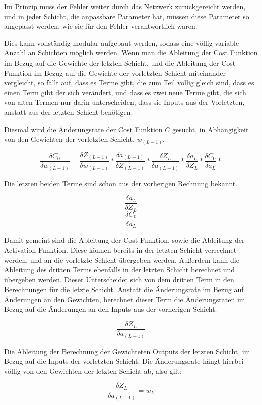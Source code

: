 \documentclass[12pt]{article}
\begin{document}
Im Prinzip muss der Fehler weiter durch das Netzwerk zurückgereicht werden, und in jeder Schicht, die anpassbare Parameter hat, müssen diese Parameter so angepasst werden, wie sie für den Fehler verantwortlich waren.

Dies kann vollständig modular aufgebaut werden, sodass eine völlig variable Anzahl an Schichten möglich werden. Wenn man die Ableitung der Cost Funktion im Bezug auf die Gewichte der letzten Schicht, und die Ableitung der Cost Funktion im Bezug auf die Gewichte der vorletzten Schicht miteinander vergleicht, so fällt auf, dass es Terme gibt, die zum Teil völlig gleich sind, dass es einen Term gibt der sich verändert, und dass es zwei neue Terme gibt, die sich von alten Termen nur darin unterscheiden, dass sie Inputs aus der Vorletzten, anstatt aus der letzten Schicht benötigen.

Diesmal wird die Änderungsrate der Cost Funktion $C$ gesucht, in Abhängigkeit von den Gewichten der vorletzten Schicht, $w_{(L-1)}$.

$$\frac{\delta C_0}{\delta w_{(L-1)}}=
\frac{\delta Z_{(L-1)}}{\delta w_{(L-1)}}*
\frac{\delta a_{(L-1)}}{\delta Z_{(L-1)}}*
\frac{\delta Z_L}{\delta a_{(L-1)}}*
\frac{\delta a_L}{\delta Z_L}*
\frac{\delta C_0}{\delta a_L}*
$$

Die letzten beiden Terme sind schon aus der vorherigen Rechnung bekannt.

$$\frac{\delta a_L}{\delta Z_L}$$
$$\frac{\delta C_0}{\delta a_L}$$

Damit gemeint sind die Ableitung der Cost Funktion, sowie die Ableitung der Activation Funktion. Diese können bereits in der letzten Schicht verrechnet werden, und an die vorletzte Schicht übergeben werden. Außerdem kann die Ableitung des dritten Terms ebenfalls in der letzten Schicht berechnet und übergeben werden. Dieser Unterscheidet sich von dem dritten Term in den Berechnungen für die letzte Schicht. Anstatt die Änderungsrate im Bezug auf Änderungen an den Gewichten, berechnet dieser Term die Änderungsraten im Bezug auf die Änderungen an den Inputs aus der vorherigen Schicht.

$$\frac{\delta Z_L}{\delta a_{(L-1)}}$$

Die Ableitung der Berechnung der Gewichteten Outputs der letzten Schicht, im Bezug auf die Inputs der vorletzten Schicht. Die Änderungsrate hängt hierbei völlig von den Gewichten der letzten Schicht ab, also gilt:

$$\frac{\delta Z_L}{\delta a_{(L-1)}} = w_L$$
\end{document}
